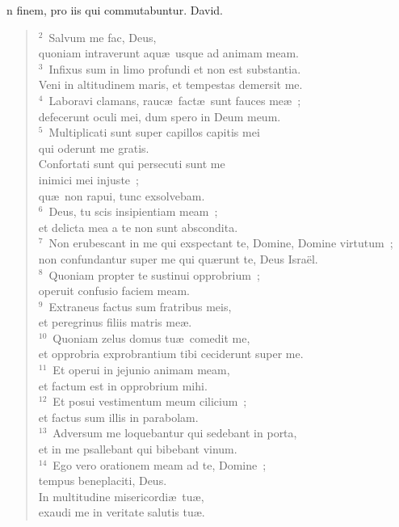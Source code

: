 \bchapter
{}n finem, pro iis qui commutabuntur. David.
\begin{flushleft}\begin{verse}\vspace{6pt}${}^{2}$~Salvum me fac, Deus,\\ quoniam intraverunt aqu\ae\ usque ad animam meam.\\
${}^{3}$~Infixus sum in limo profundi et non est substantia.\\ Veni in altitudinem maris, et tempestas demersit me.\\
${}^{4}$~Laboravi clamans, rauc\ae\ fact\ae\ sunt fauces me\ae~;\\ defecerunt oculi mei, dum spero in Deum meum.\\
${}^{5}$~Multiplicati sunt super capillos capitis mei\\ qui oderunt me gratis.\\ Confortati sunt qui persecuti sunt me\\ inimici mei injuste~;\\ qu\ae\ non rapui, tunc exsolvebam.\\
${}^{6}$~Deus, tu scis insipientiam meam~;\\ et delicta mea a te non sunt abscondita.\\
${}^{7}$~Non erubescant in me qui exspectant te, Domine, Domine virtutum~;\\ non confundantur super me qui qu\ae runt te, Deus Isra\"el.\\
${}^{8}$~Quoniam propter te sustinui opprobrium~;\\ operuit confusio faciem meam.\\
${}^{9}$~Extraneus factus sum fratribus meis,\\ et peregrinus filiis matris me\ae .\\
${}^{10}$~Quoniam zelus domus tu\ae\ comedit me,\\ et opprobria exprobrantium tibi ceciderunt super me.\\
${}^{11}$~Et operui in jejunio animam meam,\\ et factum est in opprobrium mihi.\\
${}^{12}$~Et posui vestimentum meum cilicium~;\\ et factus sum illis in parabolam.\\
${}^{13}$~Adversum me loquebantur qui sedebant in porta,\\ et in me psallebant qui bibebant vinum.\\
${}^{14}$~Ego vero orationem meam ad te, Domine~;\\ tempus beneplaciti, Deus.\\ In multitudine misericordi\ae\ tu\ae ,\\ exaudi me in veritate salutis tu\ae .\\

\end{verse}
\end{flushleft}
